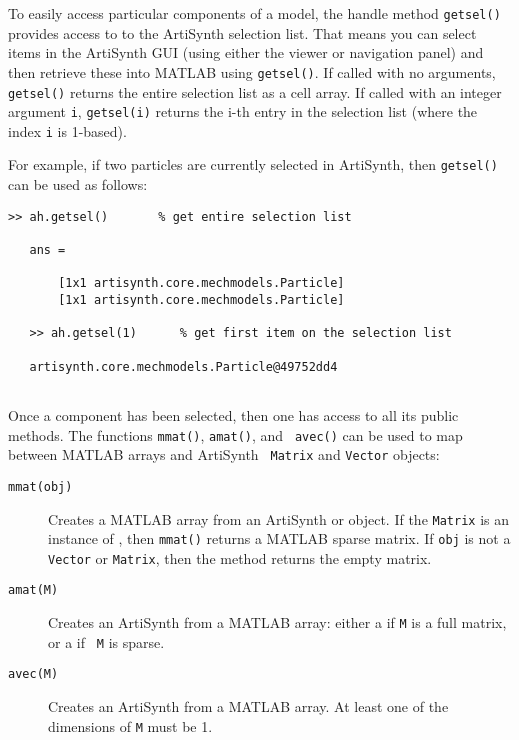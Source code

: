 \documentclass{article}
\begin{document}
To easily access particular components of a model, the handle method
{\tt getsel()} provides access to to the ArtiSynth selection
list. That means you can select items in the ArtiSynth GUI (using
either the viewer or navigation panel) and then retrieve these into
MATLAB using {\tt getsel()}. If called with no arguments, {\tt
getsel()} returns the entire selection list as a cell array.  If
called with an integer argument {\tt i}, {\tt getsel(i)} returns the
i-th entry in the selection list (where the index {\tt i} is 1-based).

For example, if two particles are currently selected in ArtiSynth, then
{\tt getsel()} can be used as follows:
%
\begin{lstlisting}[]
   >> ah.getsel()       % get entire selection list
   
   ans = 

       [1x1 artisynth.core.mechmodels.Particle]
       [1x1 artisynth.core.mechmodels.Particle]

   >> ah.getsel(1)      % get first item on the selection list

   artisynth.core.mechmodels.Particle@49752dd4
   
\end{lstlisting}
%
Once a component has been selected, then one has access to all its
public methods. The functions {\tt mmat()}, {\tt amat()}, and {\tt
avec()} can be used to map between MATLAB arrays and ArtiSynth {\tt
Matrix} and {\tt Vector} objects:

\begin{description}

\item[{\tt mmat(obj)}]\mbox{}

Creates a MATLAB array from an ArtiSynth 
 or 
object. If the {\tt Matrix} is an instance of 
, then
{\tt mmat()} returns a MATLAB sparse matrix. If {\tt obj} is not a
{\tt Vector} or {\tt Matrix}, then the method returns the empty
matrix.

\item[{\tt amat(M)}]\mbox{}

Creates an ArtiSynth  from a MATLAB
array: either a  if {\tt M} is a
full matrix, or a  if {\tt
M} is sparse.

\item[{\tt avec(M)}]\mbox{}

Creates an ArtiSynth  from a
MATLAB array. At least one of the dimensions of {\tt M} must be 1.

\end{description}
\end{document}

